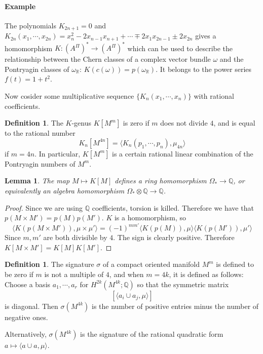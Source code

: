 \documentclass[12pt]{article}
\theoremstyle{plain}
\newtheorem{lemma}[equation]{Lemma}
\theoremstyle{definition}
\newtheorem{definition}[equation]{Definition}
\newcommand{\IQ}{\mathbb{Q}}
\newcommand{\IR}{\mathbb{R}}
\newcommand\tensor{{\otimes}}
\newcommand{\<}{\langle}
\renewcommand{\>}{\rangle}
\newcommand{\w}{\omega}
\newcommand{\Ohm}{\Omega}
\begin{document}
\paragraph{Example} The polynomials $K_{2n + 1} = 0$ and $K_{2n}(x_1, \cdots, x_{2n} ) = x_n^2 - 2 x_{n - 1} x_{n + 1} + \cdots \mp 2 x_1 x_{2n - 1} \pm 2 x_{2n}$ gives a homomorphism $K : (A^\Pi)^* \to (A^\Pi)^*$ which can be used to describe the relationship between the Chern classes of a complex vector bundle $\w$ and the Pontryagin classes of $\w_\IR$: $K(c(\w)) = p(\w_\IR)$. It belongs to the power series $f(t) = 1 + t^2$. 

Now cosider some multiplicative sequence $\{ K_n(x_1, \cdots, x_n) \}$ with rational coefficients. 

\begin{definition}
The $K$-genus $K[M^m]$ is zero if $m$ does not divide $4$, and is equal to the rational number 
$$ K_n[M^{4n}] = \< K_n(p_1, \cdots, p_n), \mu_{4n} \> $$
if $m = 4n$. In particular, $K[M^m]$ is a certain rational linear combination of the Pontryagin numbers of $M^m$. 
\end{definition}

\begin{lemma}
The map $M \mapsto K[M]$ defines a ring homomorphism $\Ohm_* \to \IQ$, or equivalently an algebra homomorphism $\Ohm_* \tensor \IQ \to \IQ$. 
\end{lemma}
\begin{proof}
Since we are using $\IQ$ coefficients, torsion is killed. Therefore we have that $p(M \times M') = p(M) p(M')$. $K$ is a homomorphism, so 
$$ \< K(p(M \times M')), \mu \times \mu' \> = (-1)^{mm'} \< K(p(M)), \mu\> \< K(p(M')), \mu' \> $$
Since $m,m'$ are both divisible by $4$. The sign is clearly positive. Therefore $K[M \times M'] = K[M]K[M']$. 
\end{proof}

\begin{definition}
The signature $\sigma$ of a compact oriented manifold $M^m$ is defined to be zero if $m$ is not a multiple of $4$, and when $m = 4k$, it is defined as follows: Choose a basis $a_1, \cdots, a_r$ for $H^{2k}(M^{4k}; \IQ)$ so that the symmetric matrix $$[\< a_i \cup a_j, \mu \>]$$ is diagonal. Then $\sigma(M^{4k})$ is the number of positive entries minus the number of negative ones. 
\end{definition}
Alternatively, $\sigma(M^{4k})$ is the signature of the rational quadratic form $a \mapsto \< a \cup a, \mu \>$. 
\end{document}
